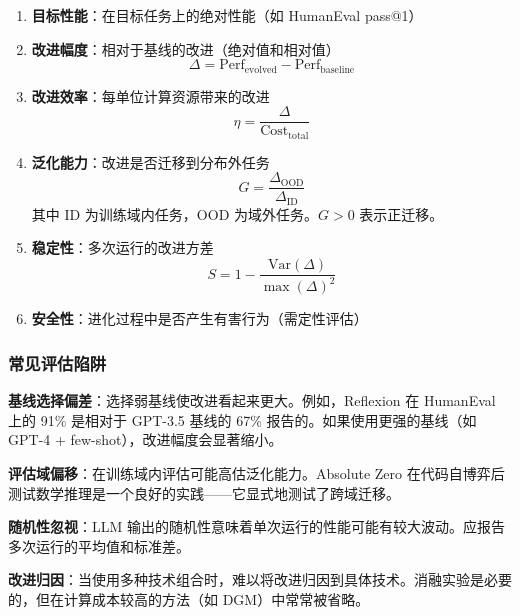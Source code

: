\begin{enumerate}
\item \textbf{目标性能}：在目标任务上的绝对性能（如 HumanEval pass@1）

\item \textbf{改进幅度}：相对于基线的改进（绝对值和相对值）
\begin{equation}
\Delta = \text{Perf}_{\mathrm{evolved}} - \text{Perf}_{\mathrm{baseline}}
\label{eq:improvement-delta}
\end{equation}

\item \textbf{改进效率}：每单位计算资源带来的改进
\begin{equation}
\eta = \frac{\Delta}{\text{Cost}_{\mathrm{total}}}
\label{eq:improvement-efficiency}
\end{equation}

\item \textbf{泛化能力}：改进是否迁移到分布外任务
\begin{equation}
G = \frac{\Delta_{\mathrm{OOD}}}{\Delta_{\mathrm{ID}}}
\label{eq:generalization-ratio}
\end{equation}
其中 ID 为训练域内任务，OOD 为域外任务。$G > 0$ 表示正迁移。

\item \textbf{稳定性}：多次运行的改进方差
\begin{equation}
S = 1 - \frac{\mathrm{Var}(\Delta)}{\max(\Delta)^2}
\label{eq:stability}
\end{equation}

\item \textbf{安全性}：进化过程中是否产生有害行为（需定性评估）
\end{enumerate}

\subsubsection{常见评估陷阱}

\textbf{基线选择偏差}：选择弱基线使改进看起来更大。例如，Reflexion 在 HumanEval 上的 91\% 是相对于 GPT-3.5 基线的 67\% 报告的。如果使用更强的基线（如 GPT-4 + few-shot），改进幅度会显著缩小。

\textbf{评估域偏移}：在训练域内评估可能高估泛化能力。Absolute Zero 在代码自博弈后测试数学推理是一个良好的实践——它显式地测试了跨域迁移。

\textbf{随机性忽视}：LLM 输出的随机性意味着单次运行的性能可能有较大波动。应报告多次运行的平均值和标准差。

\textbf{改进归因}：当使用多种技术组合时，难以将改进归因到具体技术。消融实验是必要的，但在计算成本较高的方法（如 DGM）中常常被省略。

